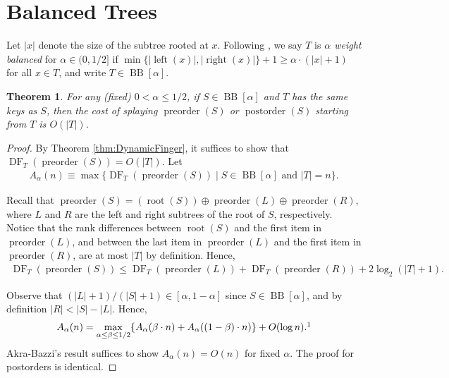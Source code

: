 \documentclass{article}
\theoremstyle{plain}
\newtheorem{theorem}{Theorem}
\theoremstyle{definition}
\DeclareMathOperator{\Root}{root}
\DeclareMathOperator{\Left}{left}
\DeclareMathOperator{\Right}{right}
\DeclareMathOperator{\Postorder}{postorder}
\DeclareMathOperator{\Preorder}{preorder}
\DeclareMathOperator{\DF}{DF}  %
\DeclareMathOperator{\BB}{BB}  %
\begin{document}
\section{Balanced Trees}\label{sec:BalancedTrees}

%
Let $|x|$ denote the size of the subtree rooted at $x$. Following
\cite{WEIGHT_BALANCED_TREES}, we say $T$ is \emph{$\alpha$ weight balanced} for
$\alpha\in (0,1/2]$ if $\min\{|\Left(x)|, |\Right(x)|\}+1\ge
\alpha\cdot(|x|+1)$ for all $x\in T$, and write $T\in\BB[\alpha]$.

%
\begin{theorem}\label{thm:BalancedTraversal}
For any \emph{(fixed)} $0<\alpha\le 1/2$, if $S\in\BB[\alpha]$ and $T$ has the
same keys as $S$, then the cost of splaying $\Preorder(S)$ or $\Postorder(S)$
starting from $T$ is $O(|T|)$.
\end{theorem}

%
\begin{proof}
By Theorem \ref{thm:DynamicFinger}, it suffices to show that
$\DF_T(\Preorder(S))=O(|T|)$. Let
\begin{align*}
A_\alpha(n)\equiv\max\{\DF_T(\Preorder(S))\mid\text{$S\in\BB[\alpha]$ and $|T|=n$}\}.
\end{align*}

%
Recall that $\Preorder(S)=(\Root(S))\oplus\Preorder(L)\oplus\Preorder(R)$,
where $L$ and $R$ are the left and right subtrees of the root of $S$,
respectively. Notice that the rank differences between $\Root(S)$ and the first
item in $\Preorder(L)$, and between the last item in $\Preorder(L)$ and the
first item in $\Preorder(R)$, are at most $|T|$ by definition. Hence,
\begin{align*}
\DF_T(\Preorder(S)) \le \DF_T(\Preorder(L)) + \DF_T(\Preorder(R)) + 2\log_2(|T|+1).
\end{align*}

%
Observe that $(|L|+1)/(|S|+1)\in[\alpha,1-\alpha]$ since $S\in\BB[\alpha]$, and by definition $|R|<|S|-|L|$. Hence,
\begin{align*}
A_\alpha(n)=\max_{\alpha\le\beta\le1/2}\{A_\alpha(\beta\cdot n) + A_\alpha((1-\beta)\cdot n)\} + O(\log n).\footnotemark
\end{align*}
%
%
Akra-Bazzi's result \cite{AKRA_BAZZI} suffices to show $A_\alpha(n)=O(n)$ for
fixed $\alpha$. The proof for postorders is identical.
\end{proof}
\end{document}
